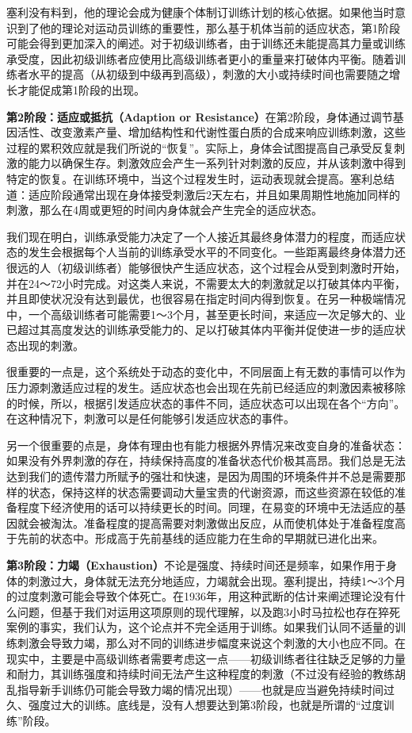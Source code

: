 塞利没有料到，他的理论会成为健康个体制订训练计划的核心依据。如果他当时意识到了他的理论对运动员训练的重要性，那么基于机体当前的适应状态，第1阶段可能会得到更加深入的阐述。对于初级训练者，由于训练还未能提高其力量或训练承受度，因此初级训练者应使用比高级训练者更小的重量来打破体内平衡。随着训练者水平的提高（从初级到中级再到高级），刺激的大小或持续时间也需要随之增长才能促成第1阶段的出现。



\textbf{第2阶段：适应或抵抗（Adaption or Resistance）}\quad 在第2阶段，身体通过调节基因活性、改变激素产量、增加结构性和代谢性蛋白质的合成来响应训练刺激，这些过程的累积效应就是我们所说的“恢复”。实际上，身体会试图提高自己承受反复刺激的能力以确保生存。刺激效应会产生一系列针对刺激的反应，并从该刺激中得到特定的恢复。在训练环境中，当这个过程发生时，运动表现就会提高。塞利总结道：适应阶段通常出现在身体接受刺激后2天左右，并且如果周期性地施加同样的刺激，那么在4周或更短的时间内身体就会产生完全的适应状态。

我们现在明白，训练承受能力决定了一个人接近其最终身体潜力的程度，而适应状态的发生会根据每个人当前的训练承受水平的不同变化。一些距离最终身体潜力还很远的人（初级训练者）能够很快产生适应状态，这个过程会从受到刺激时开始，并在24～72小时完成。对这类人来说，不需要太大的刺激就足以打破其体内平衡，并且即使状况没有达到最优，也很容易在指定时间内得到恢复。在另一种极端情况中，一个高级训练者可能需要1～3个月，甚至更长时间，来适应一次足够大的、业已超过其高度发达的训练承受能力的、足以打破其体内平衡并促使进一步的适应状态出现的刺激。

很重要的一点是，这个系统处于动态的变化中，不同层面上有无数的事情可以作为压力源刺激适应过程的发生。适应状态也会出现在先前已经适应的刺激因素被移除的时候，所以，根据引发适应状态的事件不同，适应状态可以出现在各个“方向”。在这种情况下，刺激可以是任何能够引发适应状态的事件。

另一个很重要的点是，身体有理由也有能力根据外界情况来改变自身的准备状态：如果没有外界刺激的存在，持续保持高度的准备状态代价极其高昂。我们总是无法达到我们的遗传潜力所赋予的强壮和快速，是因为周围的环境条件并不总是需要那样的状态，保持这样的状态需要调动大量宝贵的代谢资源，而这些资源在较低的准备程度下经济使用的话可以持续更长的时间。同理，在易变的环境中无法适应的基因就会被淘汰。准备程度的提高需要对刺激做出反应，从而使机体处于准备程度高于先前的状态中。形成高于先前基线的适应能力在生命的早期就已进化出来。

\textbf{第3阶段：力竭（Exhaustion）}\quad 不论是强度、持续时间还是频率，如果作用于身体的刺激过大，身体就无法充分地适应，力竭就会出现。塞利提出，持续1～3个月的过度刺激可能会导致个体死亡。在1936年，用这种武断的估计来阐述理论没有什么问题，但基于我们对运用这项原则的现代理解，以及跑3小时马拉松也存在猝死案例的事实，我们认为，这个论点并不完全适用于训练。如果我们认同不适量的训练刺激会导致力竭，那么对不同的训练进步幅度来说这个刺激的大小也应不同。在现实中，主要是中高级训练者需要考虑这一点——初级训练者往往缺乏足够的力量和耐力，其训练强度和持续时间无法产生这种程度的刺激（不过没有经验的教练胡乱指导新手训练仍可能会导致力竭的情况出现）——也就是应当避免持续时间过久、强度过大的训练。底线是，没有人想要达到第3阶段，也就是所谓的“过度训练”阶段。

